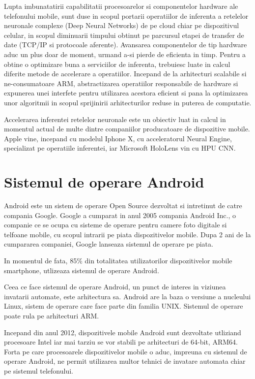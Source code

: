 	Lupta imbunatatirii capabilitatii procesoarelor si componentelor hardware ale telefonului mobile, sunt duse in scopul portarii operatiilor de inferenta a retelelor neuronale complexe (Deep Neural Networks) de pe cloud chiar pe dispozitivul celular, in scopul diminuarii timpului obtinut pe parcursul etapei de transfer de date (TCP/IP si protocoale aferente). Avansarea componentelor de tip hardware aduc un plus doar de moment, urmand a-si pierde de eficienta in timp. Pentru a obtine o optimizare buna a serviciilor de inferenta, trebuiesc luate in calcul diferite metode de accelerare a operatiilor. Incepand de la arhitecturi scalabile si ne-consumatoare ARM, abstractizarea operatiilor responsabile de hardware si expunerea unei interfete pentru utilizarea acestora eficient si pana la optimizarea unor algoritmii in scopul sprijinirii arhitecturilor reduse in puterea de computatie.
	
	Accelerarea inferentei retelelor neuronale este un obiectiv luat in calcul in momentul actual de multe dintre companiilor producatoare de dispozitive mobile. Apple vine, incepand cu modelul Iphone X, cu acceleratorul Neural Engine, specializat pe operatiile inferentei, iar Microsoft HoloLens vin cu HPU CNN. \cite{arm_ml}
	
	\section{Sistemul de operare Android}
	
	Android este un sistem de operare Open Source dezvoltat si intretinut de catre compania Google. Google a cumparat in anul 2005 compania Android Inc., o companie ce se ocupa cu sisteme de operare pentru camere foto digitale si telfoane mobile, cu scopul intrarii pe piata dispozitivelor mobile. Dupa 2 ani de la cumpararea companiei, Google lanseaza sistemul de operare pe piata. 
	
	In momentul de fata, 85\% din totalitatea utilizatorilor dispozitivelor mobile smartphone, utlizeaza sistemul de operare Android. 
	
	Ceea ce face sistemul de operare Android, un punct de interes in viziunea invatarii automate, este arhitectura sa. Android are la baza o versiune a nucleului Linux, sistem de operare care face parte din familia UNIX. Sistemul de operare poate rula pe arhitecturi ARM. 
	
	Incepand din anul 2012, dispozitivele mobile Android sunt dezvoltate utliziand procesoare Intel iar mai tarziu se vor stabili pe arhitecturi de 64-bit, ARM64. 
	Forta pe care procesoarele dispozitivelor mobile o aduc, impreuna cu sistemul de operare Android, ne permit utilizarea multor tehnici de invatare automata chiar pe sistemul telefonului. 
	
